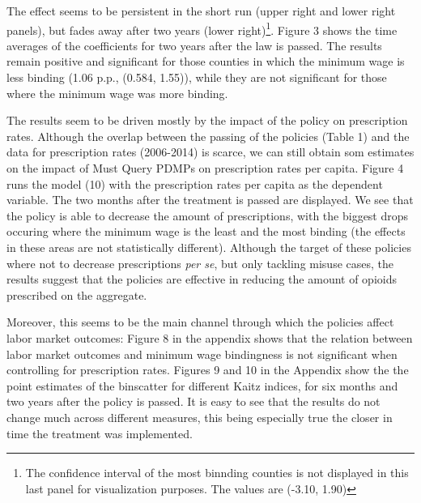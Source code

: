\documentclass[12pt,a4paper]{article}
\begin{document}
The effect seems to be persistent in the short run (upper right and lower right panels), but fades away after two years (lower right)\footnote{The confidence interval of the most binnding counties is not displayed in this last panel for visualization purposes. The values are (-3.10, 1.90)}.
Figure 3 shows the time averages of the coefficients for two years after the law is passed.
The results remain positive and significant for those counties in which the minimum wage is less binding (1.06 p.p., (0.584, 1.55)), while they are not significant for those where the minimum wage was more binding.

The results seem to be driven mostly by the impact of the policy on prescription rates.
Although the overlap between the passing of the policies (Table 1) and the data for prescription rates (2006-2014) is scarce, we can still obtain som estimates on the impact of Must Query PDMPs on prescription rates per capita.
Figure 4 runs the model (10) with the prescription rates per capita as the dependent variable.
The two months after the treatment is passed are displayed.
We see that the policy is able to decrease the amount of prescriptions, with the biggest drops occuring where the minimum wage is the least and the most binding (the effects in these areas are not statistically different). 
Although the target of these policies where not to decrease prescriptions \textit{per se}, but only tackling misuse cases, the results suggest that the policies are effective in reducing the amount of opioids prescribed on the aggregate.

Moreover, this seems to be the main channel through which the policies affect labor market outcomes: Figure 8 in the appendix shows that the relation between labor market outcomes and minimum wage bindingness is not significant when controlling for prescription rates.
Figures 9 and 10 in the Appendix show the the point estimates of the binscatter for different Kaitz indices, for six months and two years after the policy is passed.
It is easy to see that the results do not change much across different measures, this being especially true the closer in time the treatment was implemented.

\begin{comment}
After six months:
1.79 (0.955, 2.63)
0.333 (-0.665, 1.33)

After two years:
-0.118 (-1.66, 1.42)
-0.599 (-3.10, 1.90)

Time averages:
1.06  (0.584, 1.55)
0.182 (-0.335, 0.698)
\end{comment}
\end{document}
